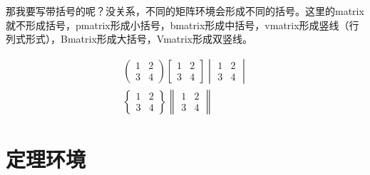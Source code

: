 那我要写带括号的呢？没关系，不同的矩阵环境会形成不同的括号。这里的matrix就不形成括号，pmatrix形成小括号，bmatrix形成中括号，vmatrix形成竖线（行列式形式），Bmatrix形成大括号，Vmatrix形成双竖线。
\begin{codeshow}
\begin{gather*}
	\begin{pmatrix}1 & 2\\
	3 & 4\end{pmatrix}
	\begin{bmatrix}1 & 2\\
	3 & 4\end{bmatrix}
	\begin{vmatrix}1 & 2\\
	3 & 4\end{vmatrix}\\
	\begin{Bmatrix}1 & 2\\
	3 & 4\end{Bmatrix}
	\begin{Vmatrix}1 & 2\\
	3 & 4\end{Vmatrix}
\end{gather*}
\end{codeshow}


\section{定理环境}